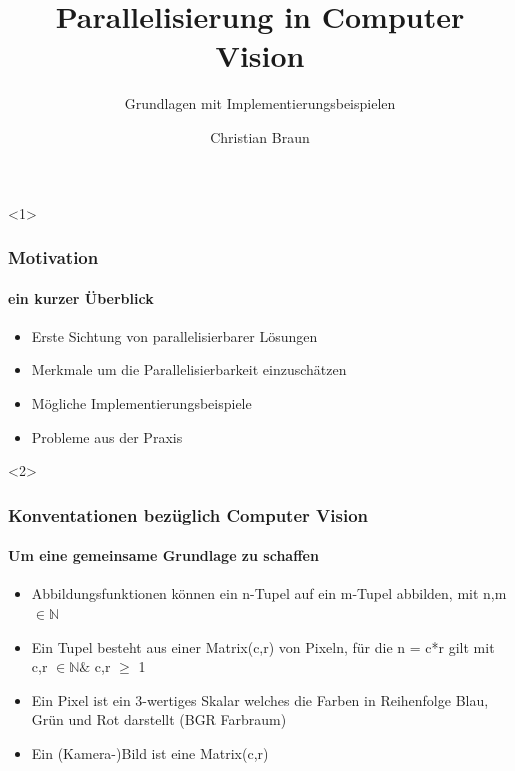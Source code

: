 \documentclass{beamer}
\title{Parallelisierung in Computer Vision}
\subtitle{Grundlagen mit Implementierungsbeispielen}
\author[Braun]{Christian Braun}
\begin{document}
\begin{frame}
  \titlepage
\end{frame}

\begin{frame}<1>
  \frametitle{Motivation}
  \framesubtitle{ein kurzer Überblick}
  
  \begin{itemize}
    \item Erste Sichtung von parallelisierbarer Lösungen
    \item Merkmale um die Parallelisierbarkeit einzuschätzen
    \item Mögliche Implementierungsbeispiele
    \item Probleme aus der Praxis
  \end{itemize}
  
\end{frame}

\begin{frame}<2>
  \frametitle{Konventationen bezüglich Computer Vision}
  \framesubtitle{Um eine gemeinsame Grundlage zu schaffen}
  \begin{itemize}
    \item Abbildungsfunktionen können ein n-Tupel auf ein m-Tupel abbilden, mit n,m $\in \mathbb{N}$
    \item Ein Tupel besteht aus einer Matrix(c,r) von Pixeln, für die n = c*r gilt mit c,r $\in \mathbb{N} \&$ c,r $\geq$ 1
    \item Ein Pixel ist ein 3-wertiges Skalar welches die Farben in Reihenfolge Blau, Grün und Rot darstellt (BGR Farbraum)
    \item Ein (Kamera-)Bild ist eine Matrix(c,r) 
  \end{itemize}
\end{frame}
\end{document}
